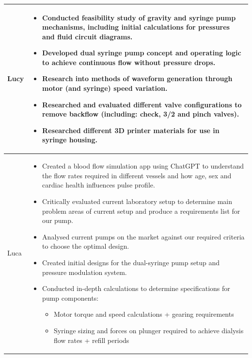 \documentclass[10pt, a4paper]{article}
\begin{document}
\begin{table}[H]
\begin{tabularx}{\linewidth}{>{\raggedright\arraybackslash}p{1cm} X}
        \midrule
        Lucy
                      & \begin{itemize}[nosep, leftmargin=*]
                            \item Conducted feasibility study of gravity and syringe pump mechanisms, including initial calculations for pressures and fluid circuit diagrams.
                            \item Developed dual syringe pump concept and operating logic to achieve continuous flow without pressure drops.
                            \item Research into methods of waveform generation through motor (and syringe) speed variation.
                            \item Researched and evaluated different valve configurations to remove backflow (including: check, 3/2 and pinch valves).
                            \item Researched different 3D printer materials for use in syringe housing.
                        \end{itemize}                                                                          \\
        \midrule
        Luca
                      & \begin{itemize}[nosep, leftmargin=*]
                            \item Created a blood flow simulation app using ChatGPT to understand the flow rates required in different vessels and how age, sex and cardiac health influences pulse profile.
                            \item Critically evaluated current laboratory setup to determine main problem areas of current setup and produce a requirements list for our pump.
                            \item Analysed current pumps on the market against our required criteria to choose the optimal design.
                            \item Created initial designs for the dual-syringe pump setup and pressure modulation system.
                            \item Conducted in-depth calculations to determine specifications for pump components:
                                  \begin{itemize}[nosep, leftmargin=*]
                      \item Motor torque and speed calculations + gearing requirements
                      \item Syringe sizing and forces on plunger required to achieve dialysis flow rates + refill periods

\end{itemize}
\end{itemize}
\end{tabularx}
\end{table}
\end{document}
